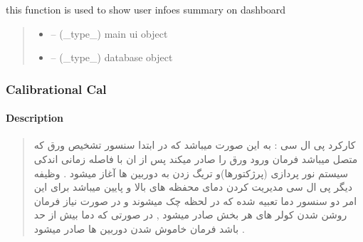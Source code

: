 \documentclass[letterpaper,10pt,english]{sphinxmanual}
\begin{document}
\begin{savenotes}\begin{fulllineitems}
\label{\detokenize{setting/backend/user_management_funcs:oxin.backend.user_management_funcs.show_users_summary_info}}
\pysigstartsignatures
{}
\pysigstopsignatures
\sphinxAtStartPar
this function is used to show user infoes summary on dashboard
\begin{quote}\begin{description}
\begin{itemize}
\item {} 
\sphinxAtStartPar
{} – (\_type\_) main ui object

\item {} 
\sphinxAtStartPar
{} – (\_type\_) database object

\end{itemize}

\end{description}\end{quote}

\end{fulllineitems}\end{savenotes}


\sphinxstepscope


\subsubsection{Calibrational Cal}
\label{\detokenize{setting/calibrationCal Dir:calibrational-cal}}\label{\detokenize{setting/calibrationCal Dir::doc}}

\paragraph{Description}
\label{\detokenize{setting/calibrationCal Dir:description}}\begin{quote}

\sphinxAtStartPar
کارکرد پی ال سی : به این صورت میباشد که در ابتدا سنسور تشخیص ورق که متصل میباشد فرمان ورود ورق را صادر میکند پس از ان با فاصله زمانی اندکی سیستم نور پردازی (پرژکتورها)و تریگ زدن به دوربین ها آغاز میشود . وظیفه دیگر پی ال سی مدیریت کردن دمای محفظه های بالا و پایین میباشد برای این امر دو سنسور دما تعبیه شده که در لحظه چک میشوند و در صورت نیاز فرمان روشن شدن کولر های هر بخش صادر میشود , در صورتی که دما بیش از حد باشد فرمان خاموش شدن دوربین ها صادر میشود .
\end{quote}
\end{document}
